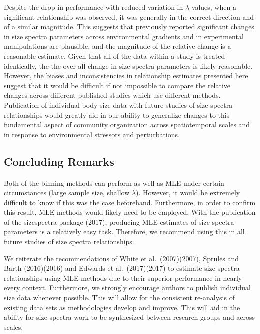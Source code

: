 \documentclass[
]{article}
\begin{document}
Despite the drop in performance with reduced variation in \(\lambda\)
values, when a significant relationship was observed, it was generally
in the correct direction and of a similar magnitude. This suggests that
previously reported significant changes in size spectra parameters
across environmental gradients and in experimental manipulations are
plausible, and the magnitude of the relative change is a reasonable
estimate. Given that all of the data within a study is treated
identically, the the over all change in size spectra parameters is
likely reasonable. However, the biases and inconsistencies in
relationship estimates presented here suggest that it would be difficult
if not impossible to compare the relative changes across different
published studies which use different methods. Publication of individual
body size data with future studies of size spectra relationships would
greatly aid in our ability to generalize changes to this fundamental
aspect of community organization across spatiotemporal scales and in
response to environmental stressors and perturbations.

\hypertarget{concluding-remarks}{%
\subsection{Concluding Remarks}\label{concluding-remarks}}

Both of the binning methods can perform as well as MLE under certain
circumstances (large sample size, shallow \(\lambda\)). However, it
would be extremely difficult to know if this was the case beforehand.
Furthermore, in order to confirm this result, MLE methods would likely
need to be employed. With the publication of the sizespectra package
(2017), producing MLE estimates of size spectra parameters is a
relatively easy task. Therefore, we recommend using this in all future
studies of size spectra relationships.

We reiterate the recommendations of White et al.~(2007)(2007), Sprules
and Barth (2016)(2016) and Edwards et al.~(2017)(2017) to estimate size
spectra relationships using MLE methods due to their superior
performance in nearly every context. Furthermore, we strongly encourage
authors to publish individual size data whenever possible. This will
allow for the consistent re-analysis of existing data sets as
methodologies develop and improve. This will aid in the ability for size
spectra work to be synthesized between research groups and across
scales.

\newpage
\end{document}
